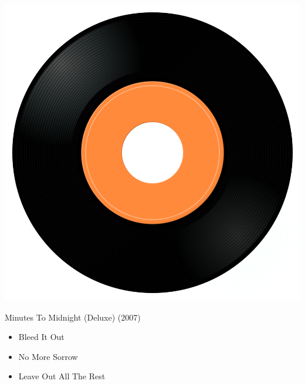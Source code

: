 \begin{minipage}[t]{0.25\textwidth}\vspace{0pt}
\captionsetup{type=figure}
\includegraphics[width=\textwidth]{Images/cover.png}
\caption*{Minutes To Midnight (Deluxe) (2007)}
\end{minipage}
\begin{minipage}[t]{0.25\textwidth}\vspace{0pt}
\begin{itemize}[nosep,leftmargin=1em,labelwidth=*,align=left]
	\setlength{\itemsep}{0pt}
	\item Bleed It Out
	\item No More Sorrow
	\item Leave Out All The Rest
\end{itemize}
\end{minipage}
